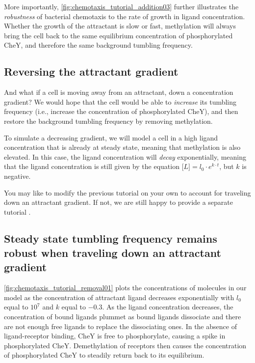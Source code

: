 More importantly, \autoref{fig:chemotaxis_tutorial_addition03} further illustrates the \textit{robustness} of bacterial chemotaxis to the rate of growth in ligand concentration. Whether the growth of the attractant is slow or fast, methylation will always bring the cell back to the same equilibrium concentration of phosphorylated CheY, and therefore the same background tumbling frequency.

\FloatBarrier
{}
\subsection{Reversing the attractant gradient}

And what if a cell is moving away from an attractant, down a concentration gradient? We would hope that the cell would be able to \textit{increase} its tumbling frequency (i.e., increase the concentration of phosphorylated CheY), and then restore the background tumbling frequency by removing methylation.

To simulate a decreasing gradient, we will model a cell in a high ligand concentration that is already at steady state, meaning that methylation is also elevated. In this case, the ligand concentration will \textit{decay} exponentially, meaning that the ligand concentration is still given by the equation $\text{[}L{]} = l_0 \cdot e^{k \cdot t}$, but $k$ is negative.\\

\begin{qbox}\end{qbox}

You may like to modify the previous tutorial on your own to account for traveling down an attractant gradient. If not, we are still happy to provide a separate tutorial .


\FloatBarrier
{}
\subsection{Steady state tumbling frequency remains robust when traveling down an attractant gradient}

\autoref{fig:chemotaxis_tutorial_removal01} plots the concentrations of molecules in our model as the concentration of attractant ligand decreases exponentially with $l_0$ equal to $10^7$ and $k$ equal to $-0.3$. As the ligand concentration decreases, the concentration of bound ligands plummet as bound ligands dissociate and there are not enough free ligands to replace the dissociating ones. In the absence of ligand-receptor binding, CheY is free to phosphorylate, causing a spike in phosphorylated CheY. Demethylation of receptors then causes the concentration of phosphorylated CheY to steadily return back to its equilibrium.


